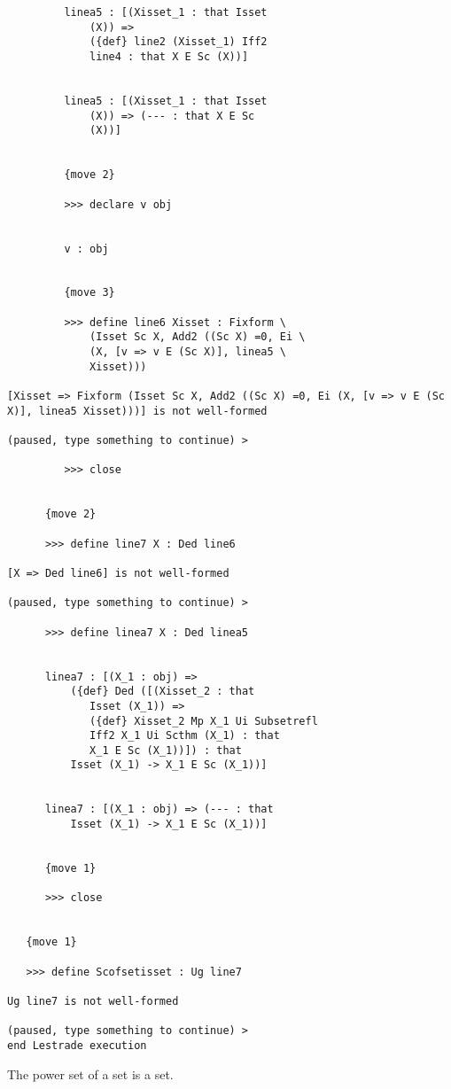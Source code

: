 \documentclass[12pt]{article}
\begin{document}
\begin{verbatim}
         linea5 : [(Xisset_1 : that Isset 
             (X)) => 
             ({def} line2 (Xisset_1) Iff2 
             line4 : that X E Sc (X))]


         linea5 : [(Xisset_1 : that Isset 
             (X)) => (--- : that X E Sc 
             (X))]


         {move 2}

         >>> declare v obj


         v : obj


         {move 3}

         >>> define line6 Xisset : Fixform \
             (Isset Sc X, Add2 ((Sc X) =0, Ei \
             (X, [v => v E (Sc X)], linea5 \
             Xisset)))

[Xisset => Fixform (Isset Sc X, Add2 ((Sc X) =0, Ei (X, [v => v E (Sc X)], linea5 Xisset)))] is not well-formed

(paused, type something to continue) >

         >>> close


      {move 2}

      >>> define line7 X : Ded line6

[X => Ded line6] is not well-formed

(paused, type something to continue) >

      >>> define linea7 X : Ded linea5


      linea7 : [(X_1 : obj) => 
          ({def} Ded ([(Xisset_2 : that 
             Isset (X_1)) => 
             ({def} Xisset_2 Mp X_1 Ui Subsetrefl 
             Iff2 X_1 Ui Scthm (X_1) : that 
             X_1 E Sc (X_1))]) : that 
          Isset (X_1) -> X_1 E Sc (X_1))]


      linea7 : [(X_1 : obj) => (--- : that 
          Isset (X_1) -> X_1 E Sc (X_1))]


      {move 1}

      >>> close


   {move 1}

   >>> define Scofsetisset : Ug line7

Ug line7 is not well-formed

(paused, type something to continue) >
end Lestrade execution
\end{verbatim}

The power set of a set is a set.
\end{document}
